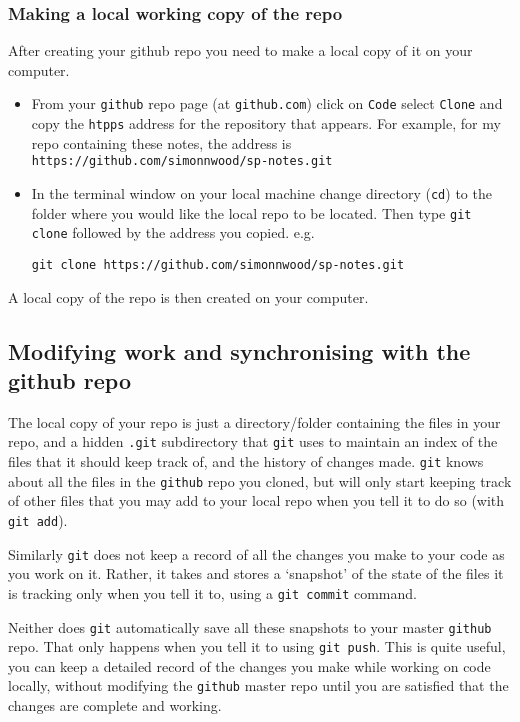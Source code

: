 \documentclass[10pt] {article}
\theoremstyle{definition}
\begin{document}
\subsubsection{Making a local working copy of the repo}

After creating your github repo you need to make a local copy of it on your computer. 
\begin{itemize}
\item From your {\tt github} repo page (at {\tt github.com}) click on {\tt Code} select {\tt Clone} and copy the {\tt htpps} address for the repository that appears. For example, for my repo containing these notes, the address is \verb+https://github.com/simonnwood/sp-notes.git+
\item In the terminal window on your local machine change directory ({\tt cd}) to the folder where you would like the local repo to be located. Then type {\tt git clone} followed by the address you copied. e.g. 
\begin{verbatim}
git clone https://github.com/simonnwood/sp-notes.git
\end{verbatim}
\end{itemize}
A local copy of the repo is then created on your computer. 

\subsection{Modifying work and synchronising with the github repo}

The local copy of your repo is just a directory/folder containing the files in your repo, and a hidden {\tt .git} subdirectory that {\tt git} uses to maintain an index of the files that it should keep track of, and the history of changes made. {\tt git} knows about all the files in the {\tt github} repo you cloned, but will only start keeping track of other files that you may add to your local repo when you tell it to do so (with \verb+git add+). 

Similarly {\tt git} does not keep a record of all the changes you make to your code as you work on it. Rather, it takes and stores a `snapshot' of the state of the files it is tracking only when you tell it to, using a {\tt git commit} command. 

Neither does {\tt git} automatically save all these snapshots to your master {\tt github} repo. That only happens when you tell it to using {\tt git push}. This is quite useful, you can keep a detailed record of the changes you make while working on code locally, without modifying the {\tt github} master repo until you are satisfied that the changes are complete and working.   
\end{document}
